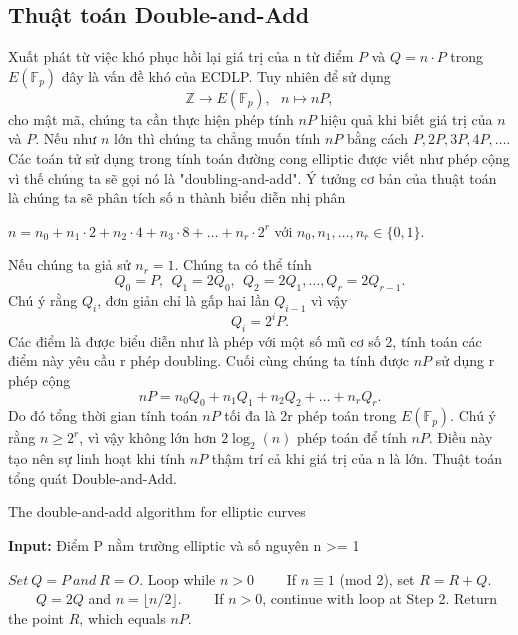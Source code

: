 \documentclass[a4paper,12pt]{report}
\begin{document}
\subsection*{Thuật toán Double-and-Add}
Xuất phát từ việc khó phục hồi lại giá trị của n từ điểm $P$ và $Q = n\cdot P$ trong $E(\mathbb{F}_{p})$ đây là vấn đề khó của ECDLP. Tuy nhiên để sử dụng
\begin{displaymath}
\mathbb{Z} \rightarrow E(\mathbb{F}_p), \ \ \ n \mapsto nP,
\end{displaymath}
cho mật mã, chúng ta cần thực hiện phép tính $nP$ hiệu quả khi biết giá trị của $n$ và $P$. Nếu như $n$ lớn thì chúng ta chẳng muốn tính $nP$ bằng cách $P, 2P, 3P, 4P, \ldots .$
Các toán tử sử dụng trong tính toán đường cong elliptic được viết như phép cộng vì thế chúng ta sẽ gọi nó là "doubling-and-add". Ý tưởng cơ bản của thuật toán là chúng ta sẽ phân tích số n thành biểu diễn nhị phân
\begin{center}
$n = n_0 + n_1\cdot2 + n_2\cdot4 + n_3\cdot8 + \ldots + n_r\cdot2^r$ với $n_0, n_1, \ldots , n_r \in \{0, 1\}$.
\end{center}
Nếu chúng ta giả sử $n_r = 1$. Chúng ta có thể tính
\begin{displaymath}
Q_0 = P, \ \ Q_1 = 2Q_0, \ \ Q_2 = 2Q_1, \ldots , Q_r = 2Q_{r - 1}.
\end{displaymath}
Chú ý rằng $Q_i$, đơn giản chỉ là gấp hai lần $Q_{i-1}$ vì vậy 
\begin{displaymath}
Q_i = 2^iP.
\end{displaymath}
Các điểm là được biểu diễn như là phép với một số mũ cơ số 2, tính toán các điểm này yêu cầu r phép doubling. Cuối cùng chúng ta tính được $nP$ sử dụng r phép cộng
\begin{displaymath}
nP = n_0Q_0 + n_1Q_1 + n_2Q_2 + \ldots + n_rQ_r.
\end{displaymath}
Do đó tổng thời gian tính toán $nP$ tối đa là 2r phép toán trong $E(\mathbb{F}_p)$. Chú ý rằng $n \geq 2^r$, vì vậy không lớn hơn $2\log_2(n)$ phép toán để tính $nP$. Điều này tạo nên sự linh hoạt khi tính $nP$ thậm trí cả khi giá trị của n là lớn. Thuật toán tổng quát Double-and-Add.
\begin{algorithm}[H]
\caption{The double-and-add algorithm for elliptic curves}
\textbf{Input:} Điểm P nằm trường elliptic và số nguyên n >= 1
\begin{algorithmic}[1]
\State $Set \ Q = P \ and \  R = O$.
\State Loop while $n > 0$
\State \ \ \ \ If $n \equiv 1$ (mod 2), set $R = R + Q$.
\State \ \ \ \ $Q = 2Q$ and $n = \lfloor n/2 \rfloor$.
\State \ \ \ \ If $n > 0$, continue with loop at Step 2.
\State Return the point $R$, which equals $nP$.
\end{algorithmic}
\end{algorithm}
\end{document}
